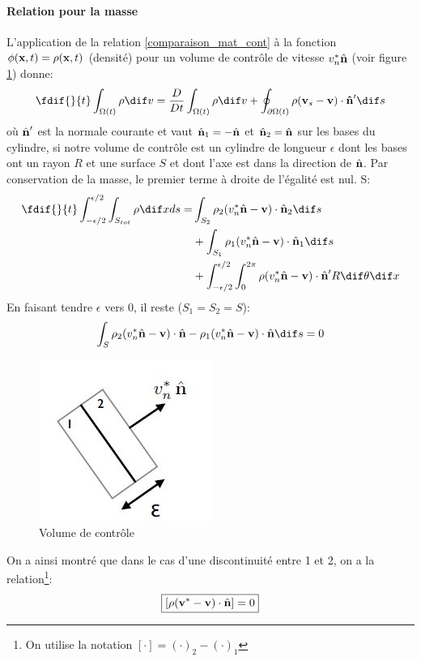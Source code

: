 \paragraph{Relation pour la masse}
L'application de la relation \ref{comparaison_mat_cont} à la fonction $\phi(\textbf{x},t)=\rho(\textbf{x},t)$ (densité) pour un volume de contrôle de vitesse $v^*_n\hat{\textbf{n}}$ (voir figure \ref{fig:disc_vol_cont}) donne:
$$\fdif{}{t}\int_{\Omega (t)}\rho  \dif v=\frac{D}{Dt}\int_{\Omega (t)}\rho  \dif v+\oint_{\partial \Omega (t)}\rho(\fv{v}_s-\fv{v})\cdot \fv{\^n}' \dif s$$
où $\hat{\textbf{n}}'$ est la normale courante et vaut $\hat{\textbf{n}}_1=-\hat{\textbf{n}}$ et $\hat{\textbf{n}}_2=\hat{\textbf{n}}$ sur les bases du cylindre, si notre volume de contrôle est un cylindre de longueur $\epsilon$ dont les bases ont un rayon $R$ et une surface $S$ et dont l'axe est dans la direction de $\hat{\textbf{n}}$.
Par conservation de la masse, le premier terme à droite de l'égalité est nul. S:
\begin{align*}
\fdif{}{t}\int_{-\epsilon/2}^{\epsilon/2}\int_{S_{tot}} \rho \dif xds=&\int_{S_2}\rho_2(v_n^*\hat{\fv{n}}-\fv{v})\cdot\hat{\fv{n}}_2 \dif s\\
 &+\int_{S_1}\rho_1(v_n^*\hat{\fv{n}}-\fv{v})\cdot\hat{\fv{n}}_1 \dif s\\
 &+\int_{-\epsilon/2}^{\epsilon/2}\int_0^{2\pi}\rho(v_n^*\hat{\fv{n}}-\fv{v})\cdot\hat{\fv{n}}'R \dif \theta  \dif x
\end{align*}
En faisant tendre $\epsilon$ vers 0, il reste ($S_1=S_2=S$):
$$\int_{S}\rho_2(v_n^*\hat{\fv{n}}-\fv{v})\cdot\hat{\fv{n}}-\rho_1(v_n^*\hat{\fv{n}}-\fv{v})\cdot\hat{\fv{n}} \dif s=0$$
\begin{figure}[!h]
\centering
\includegraphics[scale=0.6]{./discontinuite_vol_controle.jpg}
\caption{Volume de contrôle}
\label{fig:disc_vol_cont}
\end{figure}
On a ainsi montré que dans le cas d'une discontinuité entre 1 et 2, on a la relation\footnote{On utilise la notation $[\cdot]=(\cdot)_2-(\cdot)_1$}:
$$\boxed{[\rho(\textbf{v}^*-\textbf{v})\cdot\hat{\textbf{n}}]=0}$$
